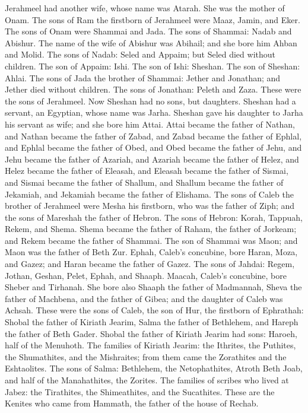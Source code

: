{Jerahmeel had another wife, whose name was Atarah. She was the mother of Onam.
The sons of Ram the firstborn of Jerahmeel were Maaz, Jamin, and Eker.
The sons of Onam were Shammai and Jada. The sons of Shammai: Nadab and Abishur.
The name of the wife of Abishur was Abihail; and she bore him Ahban and Molid.
The sons of Nadab: Seled and Appaim; but Seled died without children.
The son of Appaim: Ishi. The son of Ishi: Sheshan. The son of Sheshan: Ahlai.
The sons of Jada the brother of Shammai: Jether and Jonathan; and Jether died without children.
The sons of Jonathan: Peleth and Zaza. These were the sons of Jerahmeel.
Now Sheshan had no sons, but daughters. Sheshan had a servant, an Egyptian, whose name was Jarha.
Sheshan gave his daughter to Jarha his servant as wife; and she bore him Attai.
Attai became the father of Nathan, and Nathan became the father of Zabad,
and Zabad became the father of Ephlal, and Ephlal became the father of Obed,
and Obed became the father of Jehu, and Jehu became the father of Azariah,
and Azariah became the father of Helez, and Helez became the father of Eleasah,
and Eleasah became the father of Sismai, and Sismai became the father of Shallum,
and Shallum became the father of Jekamiah, and Jekamiah became the father of Elishama.
The sons of Caleb the brother of Jerahmeel were Mesha his firstborn, who was the father of Ziph; and the sons of Mareshah the father of Hebron.
The sons of Hebron: Korah, Tappuah, Rekem, and Shema.
Shema became the father of Raham, the father of Jorkeam; and Rekem became the father of Shammai.
The son of Shammai was Maon; and Maon was the father of Beth Zur.
Ephah, Caleb’s concubine, bore Haran, Moza, and Gazez; and Haran became the father of Gazez.
The sons of Jahdai: Regem, Jothan, Geshan, Pelet, Ephah, and Shaaph.
Maacah, Caleb’s concubine, bore Sheber and Tirhanah.
She bore also Shaaph the father of Madmannah, Sheva the father of Machbena, and the father of Gibea; and the daughter of Caleb was Achsah.
These were the sons of Caleb, the son of Hur, the firstborn of Ephrathah: Shobal the father of Kiriath Jearim,
Salma the father of Bethlehem, and Hareph the father of Beth Gader.
Shobal the father of Kiriath Jearim had sons: Haroeh, half of the Menuhoth.
The families of Kiriath Jearim: the Ithrites, the Puthites, the Shumathites, and the Mishraites; from them came the Zorathites and the Eshtaolites.
The sons of Salma: Bethlehem, the Netophathites, Atroth Beth Joab, and half of the Manahathites, the Zorites.
The families of scribes who lived at Jabez: the Tirathites, the Shimeathites, and the Sucathites. These are the Kenites who came from Hammath, the father of the house of Rechab.

}
